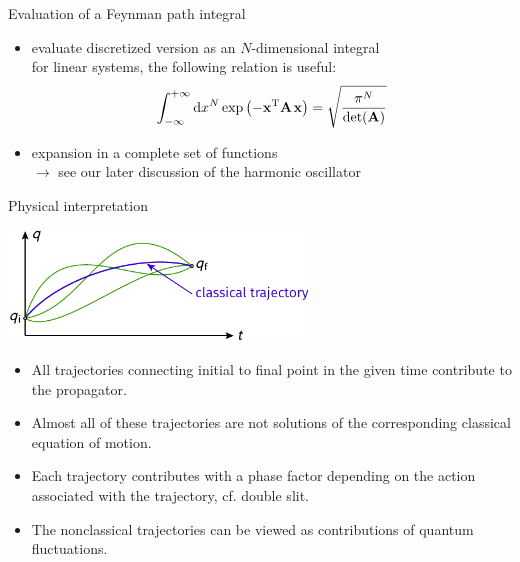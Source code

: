\documentclass[t,dvipsnames]{beamer}
\begin{document}
\begin{frame}[c]{Evaluation of a Feynman path integral}
 \begin{itemize}
  \item evaluate discretized version as an $N$-dimensional integral\\
	for linear systems, the following relation is useful:
	\begin{displaymath}
	 \int_{-\infty}^{+\infty}\text{d}x^N \exp\left(-\mathbf{x}^\text{T}
	    \mathbf{A}\hspace{0.1em}\mathbf{x}\right) =
		\sqrt{\frac{\pi^N}{\det(\mathbf{A})}}
	\end{displaymath}
  \item expansion in a complete set of functions\\
	$\rightarrow$ see our later discussion of the harmonic oscillator
 \end{itemize}

 \vspace{0.5truecm}
 \begin{center}
 \end{center}
\end{frame}

\begin{frame}[t]{Physical interpretation}
 \begin{center}
  \includegraphics[width=0.6\textwidth]{feynman}
 \end{center}

 \begin{itemize}
  \item All trajectories connecting initial to final point in the given
	time contribute to the propagator.
  \item Almost all of these trajectories are not solutions of the
        corresponding classical equation of motion.
  \item Each trajectory contributes with a phase factor depending on 
	the action associated with the trajectory, cf. double slit.
  \item The nonclassical trajectories can be viewed as contributions
	of quantum fluctuations.
 \end{itemize}
\end{frame}
\end{document}
